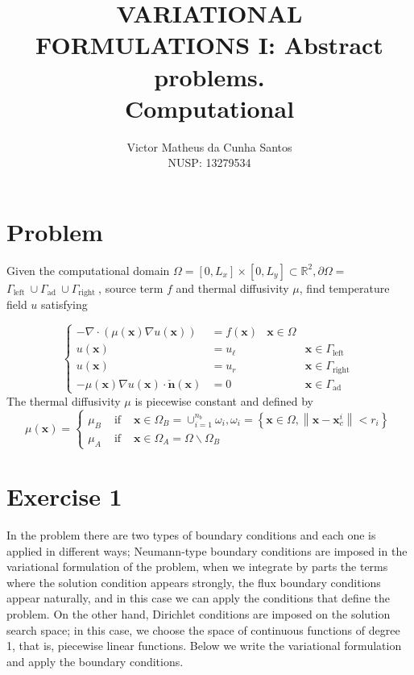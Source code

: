 \documentclass{article}
\title{VARIATIONAL FORMULATIONS I: Abstract problems.\\
	Computational}
\author{Victor Matheus da Cunha Santos\\
	NUSP: 13279534}
\begin{document}
	\maketitle
	\pagecolor{cremeSepia}
	
	\section*{Problem}	
	Given the computational domain $\Omega=\left[0, L_x\right] \times\left[0, L_y\right] \subset \mathbb{R}^2, \partial \Omega=$ $\Gamma_{\text {left }} \cup \Gamma_{\text {ad }} \cup \Gamma_{\text {right }}$, source term $f$ and thermal diffusivity $\mu$, find temperature field $u$ satisfying
	
	$$
	\left\{\begin{array}{rlrl}
		-\nabla \cdot(\mu(\mathbf{x}) \nabla u(\mathbf{x})) & =f(\mathbf{x}) & \mathbf{x} \in \Omega \\
		u(\mathbf{x}) & =u_{\ell} & & \mathbf{x} \in \Gamma_{\text {left }} \\
		u(\mathbf{x}) & =u_r & & \mathbf{x} \in \Gamma_{\text {right }} \\
		-\mu(\mathbf{x}) \nabla u(\mathbf{x}) \cdot \check{\mathbf{n}}(\mathbf{x}) & =0 & & \mathbf{x} \in \Gamma_{\text {ad }}
	\end{array}\right.
	$$
	The thermal diffusivity $\mu$ is piecewise constant and defined by
	$$
	\mu(\mathbf{x})=\left\{\begin{array}{lll}
		\mu_B & \text { if } & \mathbf{x} \in \Omega_B=\cup_{i=1}^{n_b} \omega_i, \omega_i=\left\{\mathbf{x} \in \Omega,\left\|\mathbf{x}-\mathbf{x}_c^i\right\|<r_i\right\} \\
		\mu_A & \text { if } & \mathbf{x} \in \Omega_A=\Omega \backslash \Omega_B
	\end{array}\right.
	$$	
	
	
	\section{Exercise 1}
	In the problem there are two types of boundary conditions and each one is applied in different ways; Neumann-type boundary conditions are imposed in the variational formulation of the problem, when we integrate by parts the terms where the solution condition appears strongly, the flux boundary conditions appear naturally, and in this case we can apply the conditions that define the problem. On the other hand, Dirichlet conditions are imposed on the solution search space; in this case, we choose the space of continuous functions of degree 1, that is, piecewise linear functions. Below we write the variational formulation and apply the boundary conditions.
\end{document}
